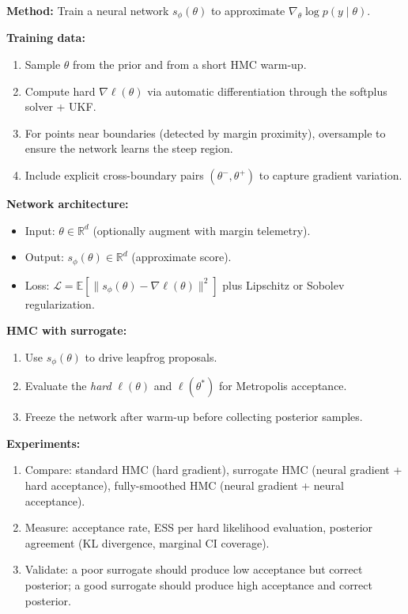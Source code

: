 \textbf{Method:} Train a neural network $s_\phi(\theta)$ to approximate
$\nabla_\theta \log p(y \mid \theta)$.

\textbf{Training data:}
\begin{enumerate}
  \item Sample $\theta$ from the prior and from a short HMC warm-up.
  \item Compute hard $\nabla \ell(\theta)$ via automatic differentiation
    through the softplus solver + UKF.
  \item For points near boundaries (detected by margin proximity), oversample
    to ensure the network learns the steep region.
  \item Include explicit cross-boundary pairs $(\theta^-, \theta^+)$ to
    capture gradient variation.
\end{enumerate}

\textbf{Network architecture:}
\begin{itemize}
  \item Input: $\theta \in \mathbb{R}^d$ (optionally augment with margin
    telemetry).
  \item Output: $s_\phi(\theta) \in \mathbb{R}^d$ (approximate score).
  \item Loss: $\mathcal{L} = \mathbb{E}\left[ \|s_\phi(\theta) - \nabla \ell(\theta)\|^2 \right]$
    plus Lipschitz or Sobolev regularization.
\end{itemize}

\textbf{HMC with surrogate:}
\begin{enumerate}
  \item Use $s_\phi(\theta)$ to drive leapfrog proposals.
  \item Evaluate the \emph{hard} $\ell(\theta)$ and $\ell(\theta^*)$ for
    Metropolis acceptance.
  \item Freeze the network after warm-up before collecting posterior samples.
\end{enumerate}

\textbf{Experiments:}
\begin{enumerate}
  \item Compare: standard HMC (hard gradient), surrogate HMC (neural gradient
    + hard acceptance), fully-smoothed HMC (neural gradient + neural
    acceptance).
  \item Measure: acceptance rate, ESS per hard likelihood evaluation,
    posterior agreement (KL divergence, marginal CI coverage).
  \item Validate: a poor surrogate should produce low acceptance but correct
    posterior; a good surrogate should produce high acceptance and correct
    posterior.
\end{enumerate}

